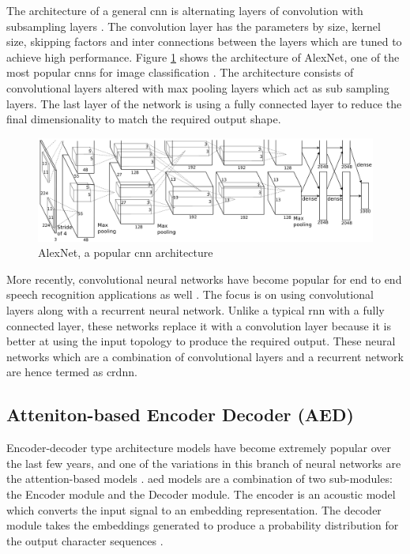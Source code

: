The architecture of a general \acrshort{cnn} is alternating layers of convolution with subsampling layers \cite{Ciresan2011FlexibleClassification}. The convolution layer has the parameters by size, kernel size, skipping factors and inter connections between the layers which are tuned to achieve high performance. Figure \ref{fig:cnn} shows the architecture of AlexNet, one of the most popular \acrshort{cnn}s for image classification \cite{Krizhevsky2012ImageNetNetworks}. The architecture consists of convolutional layers altered with max pooling layers which act as sub sampling layers. The last layer of the network is using a fully connected layer to reduce the final dimensionality to match the required output shape.
\begin{figure}[ht]
  \begin{center}
    \includegraphics[width=\textwidth]{images/cnn.png} 
    \caption{AlexNet, a popular \acrshort{cnn} architecture  \cite{Krizhevsky2012ImageNetNetworks}}
    \label{fig:cnn}
  \end{center}
\end{figure}

More recently, convolutional neural networks have become popular for end to end speech recognition applications as well \cite{Zhang2017VeryRecognition}. The focus is on using convolutional layers along with a recurrent neural network. Unlike a typical \acrshort{rnn} with a fully connected layer, these networks replace it with a convolution layer because it is better at using the input topology to produce the required output. These neural networks which are a combination of convolutional layers and a recurrent network are hence termed as \acrfull{crdnn}. 

\subsection {Atteniton-based Encoder Decoder (AED)}
Encoder-decoder type architecture models have become extremely popular over the last few years, and one of the variations in this branch of neural networks are the attention-based models \cite{Prabhavalkar2017ARecognition}. \acrfull{aed} models are a combination of two sub-modules: the Encoder module and the Decoder module. The encoder is an acoustic model which converts the input signal to an embedding representation. The decoder module takes the embeddings generated to produce a probability distribution for the output character sequences \cite{Zhang2017VeryRecognition, Chan2016ListenRecognition}.


